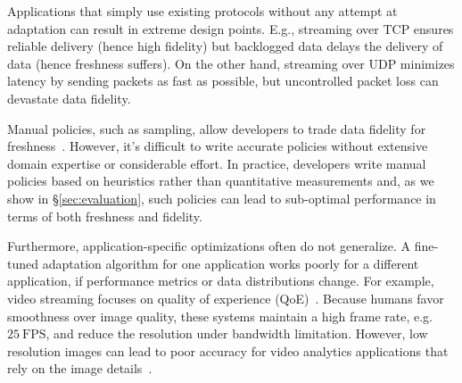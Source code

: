 Applications that simply use existing protocols without any attempt at adaptation can 
result in extreme design points. E.g., streaming over TCP ensures reliable 
delivery (hence high fidelity) but backlogged data delays the delivery of data (hence freshness suffers). 
On the other hand, streaming over UDP minimizes latency by sending packets as fast 
as possible, but uncontrolled packet loss can devastate data fidelity.

Manual policies, such as sampling, allow developers to trade data fidelity for
freshness~\cite{rabkin2014aggregation}. However, it's difficult to write
accurate policies without extensive domain expertise or considerable effort. In
practice, developers write manual policies based on heuristics rather than
quantitative measurements and, as we show in \S\ref{sec:evaluation}, such policies 
can lead to sub-optimal performance in terms of both freshness and fidelity.

Furthermore, application-specific optimizations often do not generalize. A fine-tuned
adaptation algorithm for one application works poorly for a different
application, if performance metrics or data distributions change.  For example,
video streaming focuses on quality of experience
(QoE)~\cite{michalos2012dynamic, pantos2016http, yin2015control}. Because humans
favor smoothness over image quality, these systems maintain a high frame rate,
e.g.\,\(25~\text{FPS}\), and reduce the resolution under bandwidth limitation.
However, low resolution images can lead to poor accuracy for video analytics 
applications that rely on the image details~\cite{lowe2004distinctive, viola2001rapid}.


